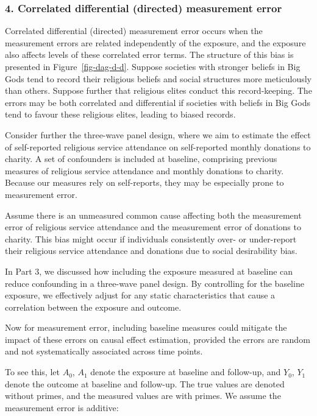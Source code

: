 \documentclass[
  singlecolumn]{article}
\begin{document}
\hypertarget{correlated-differential-directed-measurement-error}{%
\subsubsection{4. Correlated differential (directed) measurement
error}\label{correlated-differential-directed-measurement-error}}

Correlated differential (directed) measurement error occurs when the
measurement errors are related independently of the exposure, and the
exposure also affects levels of these correlated error terms. The
structure of this bias is presented in Figure~\ref{fig-dag-d-d}. Suppose
societies with stronger beliefs in Big Gods tend to record their
religious beliefs and social structures more meticulously than others.
Suppose further that religious elites conduct this record-keeping. The
errors may be both correlated and differential if societies with beliefs
in Big Gods tend to favour these religious elites, leading to biased
records.

Consider further the three-wave panel design, where we aim to estimate
the effect of self-reported religious service attendance on
self-reported monthly donations to charity. A set of confounders is
included at baseline, comprising previous measures of religious service
attendance and monthly donations to charity. Because our measures rely
on self-reports, they may be especially prone to measurement error.

Assume there is an unmeasured common cause affecting both the
measurement error of religious service attendance and the measurement
error of donations to charity. This bias might occur if individuals
consistently over- or under-report their religious service attendance
and donations due to social desirability bias.

In Part 3, we discussed how including the exposure measured at baseline
can reduce confounding in a three-wave panel design. By controlling for
the baseline exposure, we effectively adjust for any static
characteristics that cause a correlation between the exposure and
outcome.

Now for measurement error, including baseline measures could mitigate
the impact of these errors on causal effect estimation, provided the
errors are random and not systematically associated across time points.

To see this, let \(A_0\), \(A_1\) denote the exposure at baseline and
follow-up, and \(Y_0\), \(Y_1\) denote the outcome at baseline and
follow-up. The true values are denoted without primes, and the measured
values are with primes. We assume the measurement error is additive:
\end{document}
